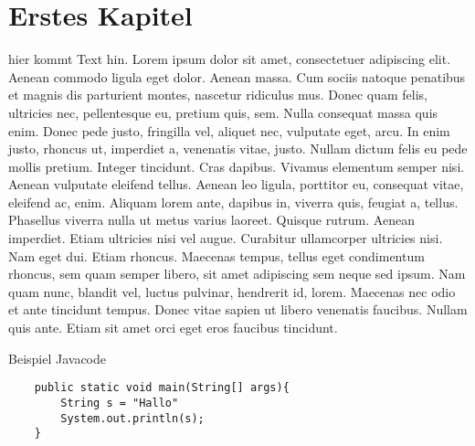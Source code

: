 \documentclass[11pt]{article}
\begin{document}



\tableofcontents
\newpage
\listoffigures
\newpage
\renewcommand*{\listoflistingscaption}{Listingverzeichnis}
\listoflistings
\newpage



\section{Erstes Kapitel}
hier kommt Text hin.
Lorem ipsum dolor sit amet, consectetuer adipiscing elit. Aenean commodo ligula eget dolor. Aenean massa. Cum sociis natoque penatibus et magnis dis parturient montes, nascetur ridiculus mus. Donec quam felis, ultricies nec, pellentesque eu, pretium quis, sem. Nulla consequat massa quis enim. Donec pede justo, fringilla vel, aliquet nec, vulputate eget, arcu. In enim justo, rhoncus ut, imperdiet a, venenatis vitae, justo. Nullam dictum felis eu pede mollis pretium. Integer tincidunt. Cras dapibus. Vivamus elementum semper nisi. Aenean vulputate eleifend tellus. Aenean leo ligula, porttitor eu, consequat vitae, eleifend ac, enim. Aliquam lorem ante, dapibus in, viverra quis, feugiat a, tellus. Phasellus viverra nulla ut metus varius laoreet. Quisque rutrum. Aenean imperdiet. Etiam ultricies nisi vel augue. Curabitur ullamcorper ultricies nisi. Nam eget dui. Etiam rhoncus. Maecenas tempus, tellus eget condimentum rhoncus, sem quam semper libero, sit amet adipiscing sem neque sed ipsum. Nam quam nunc, blandit vel, luctus pulvinar, hendrerit id, lorem. Maecenas nec odio et ante tincidunt tempus. Donec vitae sapien ut libero venenatis faucibus. Nullam quis ante. Etiam sit amet orci eget eros faucibus tincidunt.

\begin{listing}[H]
    \caption{Beispiel Javacode}
    \label{lst:mein_quelltext}
    \begin{verbatim}
    public static void main(String[] args){
        String s = "Hallo"
        System.out.println(s);
    }
    \end{verbatim}
\end{listing}
\end{document}
